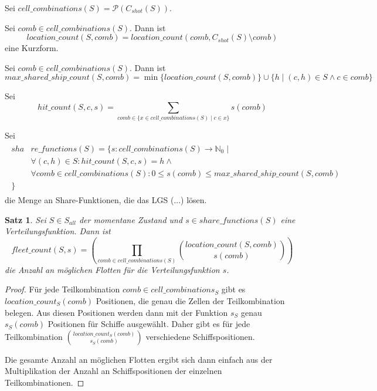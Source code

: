 \documentclass[a4paper,12pt]{llncs}
\numberwithin{equation}{section}
\newtheorem{satz}{Satz}
\begin{document}
\begin{definition}
Sei $cell\_combinations(S)=\mathcal{P}(C_{shot}(S))$.
\end{definition}

\begin{definition}
Sei $comb \in cell\_combinations(S)$. Dann ist
\[
location\_count(S,comb)=location\_count(comb, C_{shot}(S) \setminus comb)
\]
eine Kurzform.
\end{definition}

\begin{definition}
Sei $comb \in cell\_combinations(S)$. Dann ist
\[
max\_shared\_ship\_count(S,comb)=\min\{location\_count(S, comb)\} \cup \{h \mid (c,h) \in S \wedge c \in comb\}
\]
\end{definition}

\begin{definition}
Sei
\[
hit\_count(S, c, s)=\sum_{comb \in \{x \in cell\_combinations(S) \mid c \in x\}}{s(comb)}
\]
\end{definition}

\begin{definition}
Sei
\begin{align}
\begin{split}
sha&re\_functions(S)=\{s \colon cell\_combinations(S) \rightarrow \mathbb{N}_0 \mid\\
&\forall{(c,h) \in S}\colon hit\_count(S, c, s)=h \wedge \\
&\forall{comb \in cell\_combinations(S)} \colon 0 \leq s(comb) \leq max\_shared\_ship\_count(S, comb)\\
\}\;\;\;& \nonumber
\end{split}
\end{align}
die Menge an Share-Funktionen, die das LGS (...) lösen.
\end{definition}

\begin{satz}
Sei $S\in S_{all}$ der momentane Zustand und $s \in share\_functions(S)$ eine Verteilungsfunktion.
Dann ist
\[
fleet\_count(S, s)=
\left( \prod_{comb \in cell\_combinations(S)}{{location\_count(S, comb)\choose s(comb)}} \right)
\]
die Anzahl an möglichen Flotten für die Verteilungsfunktion $s$.
\end{satz}

\begin{proof}
Für jede Teilkombination $comb \in cell\_combinations_S$ gibt es $location\_count_S(comb)$ Positionen, die genau die Zellen der Teilkombination belegen. Aus diesen Positionen werden dann mit der Funktion $s_S$ genau $s_S(comb)$ Positionen für Schiffe ausgewählt. Daher gibt es für jede Teilkombination ${location\_count_S(comb)\choose s_S(comb)}$ verschiedene Schiffspositionen.

Die gesamte Anzahl an möglichen Flotten ergibt sich dann einfach aus der Multiplikation der Anzahl an Schiffspositionen der einzelnen Teilkombinationen.
\end{proof}
\end{document}
